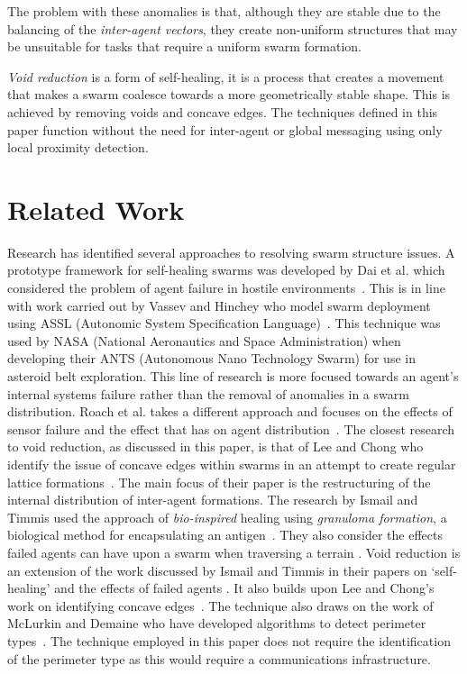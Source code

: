 \documentclass[preprint,12pt]{elsarticle}
\begin{document}
The problem with these anomalies is that, although they are stable due to the balancing of the \textit{inter-agent vectors}, they create non-uniform structures that may be unsuitable for tasks that require a uniform swarm formation.

\textit{Void reduction} is a form of self-healing, it is a process that creates a movement that makes a swarm coalesce towards a more geometrically stable shape. This is achieved by removing voids and concave edges. The techniques defined in this paper function without the need for inter-agent or global messaging using only local proximity detection.

\section{Related Work}\label{sec:RelatedWork}
Research has identified several approaches to resolving swarm structure issues. A prototype framework for self-healing swarms was developed by Dai et al. which considered the problem of agent failure in hostile environments~\cite{DHMRZ:06}. This is in line with work carried out by Vassev and Hinchey who model swarm deployment using ASSL (Autonomic System Specification Language)~\cite{VH:09}. This technique was used by NASA (National Aeronautics and Space Administration) when developing their ANTS (Autonomous Nano Technology Swarm) for use in asteroid belt exploration. This line of research is more focused towards an agent's internal systems failure rather than the removal of anomalies in a swarm distribution. Roach et al. takes a different approach and focuses on the effects of sensor failure and the effect that has on agent distribution~\cite{RMT:15}. The closest research to void reduction, as discussed in this paper, is that of Lee and Chong who identify the issue of concave edges within swarms in an attempt to create regular lattice formations~\cite{GN:08}. The main focus of their paper is the restructuring of the internal distribution of inter-agent formations. The research by Ismail and Timmis used the approach of \textit{bio-inspired} healing using \textit{granuloma formation}, a biological method for encapsulating an antigen~\cite{IT:10}. They also consider the effects failed agents can have upon a swarm when traversing a terrain \cite{TIBW:16}. 
Void reduction is an extension of the work discussed by Ismail and Timmis in their papers on `self-healing' \cite{IT:10} and the effects of failed agents \cite{TIBW:16}. It also builds upon Lee and Chong's work on identifying concave edges~\cite{GN:08}. The technique also draws on the work of McLurkin and Demaine who have developed algorithms to detect perimeter types~\cite{MD:09}. The technique employed in this paper does not require the identification of the perimeter type as this would require a communications infrastructure.
\end{document}
